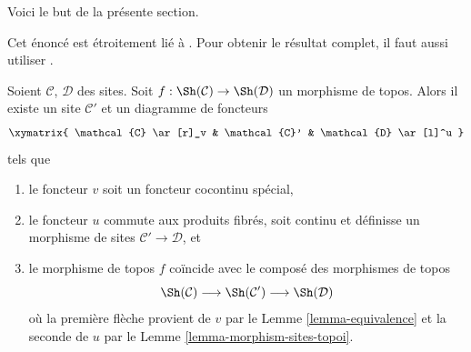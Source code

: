 \noindent
Voici le but de la présente section.

\begin{lemma}
\label{lemma-morphism-topoi-comes-from-morphism-sites}
\begin{reference}
Cet énoncé est étroitement lié à
\cite[Proposition 4.9.4. Expos\'e IV]{SGA4}.
Pour obtenir le résultat complet, il faut aussi utiliser
\cite[Remarque 4.7.4, Expos\'e IV]{SGA4}.
\end{reference}
Soient $\mathcal{C}$, $\mathcal{D}$ des sites.
Soit $f : \Sh(\mathcal{C}) \to \Sh(\mathcal{D})$ un
morphisme de topos.
Alors il existe un site $\mathcal{C}'$ et un diagramme de foncteurs
$$
\xymatrix{
\mathcal{C} \ar[r]_v & \mathcal{C}' & \mathcal{D} \ar[l]^u
}
$$
tels que
\begin{enumerate}
\item le foncteur $v$ soit un foncteur cocontinu spécial,
\item le foncteur $u$ commute aux produits fibrés, soit
continu et définisse un morphisme de sites
$\mathcal{C}' \to \mathcal{D}$, et
\item le morphisme de topos $f$ coïncide avec le composé
des morphismes de topos
$$
\Sh(\mathcal{C}) \longrightarrow
\Sh(\mathcal{C}') \longrightarrow
\Sh(\mathcal{D})
$$
où la première flèche provient de $v$ par le Lemme \ref{lemma-equivalence}
et la seconde de $u$ par le Lemme \ref{lemma-morphism-sites-topoi}.
\end{enumerate}
\end{lemma}

